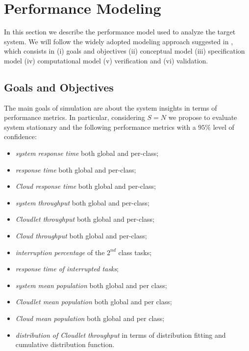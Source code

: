 \section{Performance Modeling}
\label{sec:performance-modeling}

In this section we describe the performance model used to analyze the target system. We will follow the widely adopted modeling approach suggested in \cite{leemis2006discrete}, which consists in (i) goals and objectives (ii) conceptual model (iii) specification model (iv) computational model (v) verification and (vi) validation.


\subsection{Goals and Objectives}
The main goals of simulation are about the system insights in terms of performance metrics.
%
In particular, considering $S=N$ we propose to evaluate system stationary and the following performance metrics with a $95\%$ level of confidence:

\begin{itemize}
	\item \textit{system response time} both global and per-class;
	
	\item \textit{response time} both global and per-class;
	
	\item \textit{Cloud response time} both global and per-class;
	
	\item \textit{system throughput} both global and per-class;
	
	\item \textit{Cloudlet throughput} both global and per-class;
	
	\item \textit{Cloud throughput} both global and per-class;
	
	\item \textit{interruption percentage} of the $2^{nd}$ class tasks;
	
	\item \textit{response time of interrupted tasks};
	
	\item \textit{system mean population} both global and per class;
	
	\item \textit{Cloudlet mean population} both global and per class;
	
	\item \textit{Cloud mean population} both global and per class;
	
	\item \textit{distribution of Cloudlet throughput} in terms of distribution fitting and cumulative distribution function.

\end{itemize}



